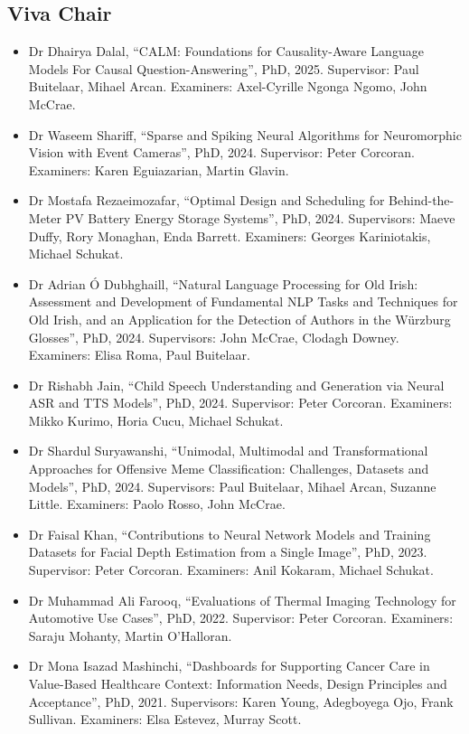 \documentclass[10pt,a4paper]{res} %
\begin{document}
\begin{resume}
\subsection*{Viva Chair}

\begin{itemize} \itemsep -2pt
\item Dr Dhairya Dalal, ``CALM: Foundations for Causality-Aware Language Models For Causal Question-Answering'', PhD, 2025. Supervisor: Paul Buitelaar, Mihael Arcan. Examiners: Axel-Cyrille Ngonga Ngomo, John McCrae. %
\item Dr Waseem Shariff, ``Sparse and Spiking Neural Algorithms for Neuromorphic Vision with Event Cameras'', PhD, 2024. Supervisor: Peter Corcoran. Examiners: Karen Eguiazarian, Martin Glavin. %
\item Dr Mostafa Rezaeimozafar, ``Optimal Design and Scheduling for Behind-the-Meter PV Battery Energy Storage Systems'', PhD, 2024. Supervisors: Maeve Duffy, Rory Monaghan, Enda Barrett. Examiners: Georges Kariniotakis, Michael Schukat. %
\item Dr Adrian \'{O} Dubhghaill, ``Natural Language Processing for Old Irish: Assessment and Development of Fundamental NLP Tasks and Techniques for Old Irish, and an Application
for the Detection of Authors in the W\"{u}rzburg Glosses'', PhD, 2024. Supervisors: John McCrae, Clodagh Downey. Examiners: Elisa Roma, Paul Buitelaar. %
\item Dr Rishabh Jain, ``Child Speech Understanding and Generation via Neural ASR and TTS Models'', PhD, 2024. Supervisor: Peter Corcoran. Examiners: Mikko Kurimo, Horia Cucu, Michael Schukat. %
\item Dr Shardul Suryawanshi, ``Unimodal, Multimodal and Transformational Approaches for Offensive Meme Classification: Challenges, Datasets and Models'', PhD, 2024. Supervisors: Paul Buitelaar, Mihael Arcan, Suzanne Little. Examiners: Paolo Rosso, John McCrae. %
\item Dr Faisal Khan, ``Contributions to Neural Network Models and Training Datasets for Facial Depth Estimation from a Single Image'', PhD, 2023. Supervisor: Peter Corcoran. Examiners: Anil Kokaram, Michael Schukat. %
\item Dr Muhammad Ali Farooq, ``Evaluations of Thermal Imaging Technology for Automotive Use Cases'', PhD, 2022. Supervisor: Peter Corcoran. Examiners: Saraju Mohanty, Martin O'Halloran. %
\item Dr Mona Isazad Mashinchi, ``Dashboards for Supporting Cancer Care in Value-Based Healthcare Context: Information Needs, Design Principles and Acceptance'', PhD, 2021. Supervisors: Karen Young, Adegboyega Ojo, Frank Sullivan. Examiners: Elsa Estevez, Murray Scott.

\end{itemize}
\end{resume}
\end{document}
